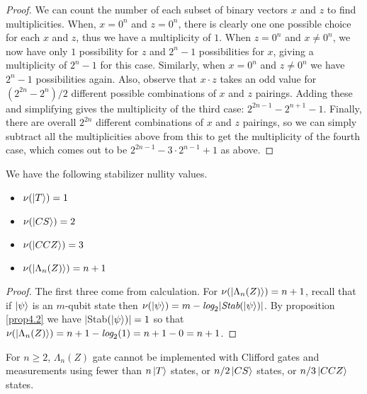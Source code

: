 \documentclass[12pt]{dalthesis}
\begin{document}
\begin{proof}
We can count the number of each subset of binary vectors $x$ and $z$ to find multiplicities. When, $x=0^n$ and $z = 0^n$, there is clearly one one possible choice for each $x$ and $z$, thus we have a multiplicity of $1$. When $z = 0^n$ and $x \neq 0^n$, we now have only $1$ possibility for $z$ and $2^n - 1$ possibilities for $x$, giving a multiplicity of $2^n - 1$ for this case. Similarly, when $x = 0^n$ and $z \neq 0^n$ we have $2^n - 1$ possibilities again. Also, observe that $x \cdot z$ takes an odd value for $(2^{2n}-2^{n})/2$ different possible combinations of $x$ and $z$ pairings. Adding these and simplifying gives the multiplicity of the third case: $2^{2n-1} - 2^{n+1} - 1$. Finally, there are overall $2^{2n}$ different combinations of $x$ and $z$ pairings, so we can simply subtract all the multiplicities above from this to get the multiplicity of the fourth case, which comes out to be $2^{2n-1} - 3 \cdot 2^{n-1} + 1$ as above.
\end{proof}

\begin{corollary}
\label{nu values}
We have the following stabilizer nullity values.
\begin{itemize}
\item $\nu (\ket{T}) = 1$
\item $\nu (\ket{CS}) = 2$
\item $\nu (\ket{CCZ}) = 3$
\item $\nu (\ket{\Lambda_n (Z)}) = n+1$
\end{itemize}
\end{corollary}
\begin{proof}
The first three come from calculation. For $\nu (\ket{\Lambda_n (Z)}) = n+1$, recall that if $\ket{\psi}$ is an $m$-qubit state then $\nu (\ket{\psi}) = m - \textit{log}_2|\textit{Stab}(\ket{\psi})|$. By proposition \ref{prop4.2} we have $|$Stab$(\ket{\psi})| = 1$ so that $\nu (\ket{\Lambda_n (Z)}) = n+1 - \textit{log}_2 (1) = n+1-0 = n+1$.
\end{proof}

\begin{proposition}
For $n \geq 2$, $\Lambda_n (Z)$ gate cannot be implemented with Clifford gates and measurements using fewer than $n\ket{T}$ states, or $n/2 \ket{CS}$ states, or $n/3 \ket{CCZ}$ states.
\end{proposition}
\end{document}

